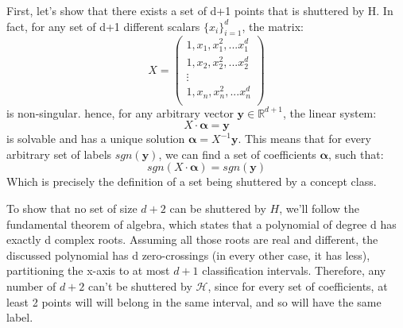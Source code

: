 First, let's show that there exists a set of d+1 points that is shuttered by H. 
In fact, for any set of d+1 different scalars $\{x_i\}_{i=1}^d$, the matrix:
\begin{equation*}
    X = \begin{pmatrix}
        1, x_1, x_1^2, ... x_1^d \\
        1, x_2, x_2^2, ... x_2^d \\
        \vdots \\
        1, x_n, x_n^2, ... x_n^d \\
    \end{pmatrix}
\end{equation*}
is non-singular. hence, for any arbitrary vector $\boldsymbol{y} \in \mathbb{R}^{d+1}$, the linear system:
\begin{equation*}
    X \cdot \boldsymbol{\alpha} = \boldsymbol{y}
\end{equation*}
is solvable and has a unique solution $\boldsymbol{\alpha} = X^{-1}\boldsymbol{y}$. This means that for every arbitrary set of labels $sgn(\boldsymbol{y})$, we can find a set of coefficients $\boldsymbol{\alpha}$, such that:
\begin{equation*}
    sgn(X \cdot \boldsymbol{\alpha}) = sgn(\boldsymbol{y})
\end{equation*}
Which is precisely the definition of a set being shuttered by a concept class.

To show that no set of size $d+2$ can be shuttered by $H$, we'll follow the fundamental theorem of algebra, which states that a polynomial of degree d has exactly d complex roots. Assuming all those roots are real and different, the discussed polynomial has d zero-crossings (in every other case, it has less), partitioning the x-axis to at most $d+1$ classification intervals. Therefore, any number of $d+2$ can't be shuttered by $\mathcal{H}$, since for every set of coefficients, at least 2 points will will belong in the same interval, and so will have the same label.
